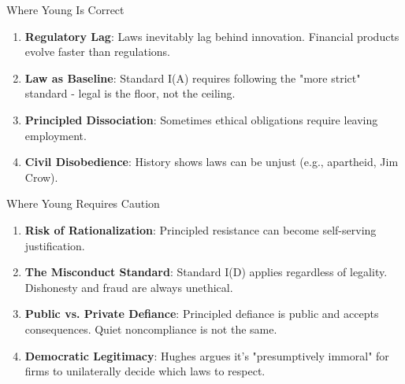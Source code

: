 \documentclass{beamer}
\begin{document}
	\begin{frame}{Where Young Is Correct}
		\begin{enumerate}
			\item \textbf{Regulatory Lag}: Laws inevitably lag behind innovation. Financial products evolve faster than regulations.
			\item \textbf{Law as Baseline}: Standard I(A) requires following the "more strict" standard - legal is the floor, not the ceiling.
			\item \textbf{Principled Dissociation}: Sometimes ethical obligations require leaving employment.
			\item \textbf{Civil Disobedience}: History shows laws can be unjust (e.g., apartheid, Jim Crow).
		\end{enumerate}
		\vspace{0.2cm}
		\begin{center}
		\end{center}
	\end{frame}
	
	\begin{frame}{Where Young Requires Caution}
		\begin{enumerate}
			\item \textbf{Risk of Rationalization}: Principled resistance can become self-serving justification.
			\item \textbf{The Misconduct Standard}: Standard I(D) applies regardless of legality. Dishonesty and fraud are always unethical.
			\item \textbf{Public vs. Private Defiance}: Principled defiance is \textcolor{cfablue}{public} and accepts consequences. Quiet noncompliance is not the same.
			\item \textbf{Democratic Legitimacy}: Hughes argues it's "presumptively immoral" for firms to unilaterally decide which laws to respect.
		\end{enumerate}
		\vspace{0.2cm}
		\begin{center}
		\end{center}
	\end{frame}
	
\end{document}
